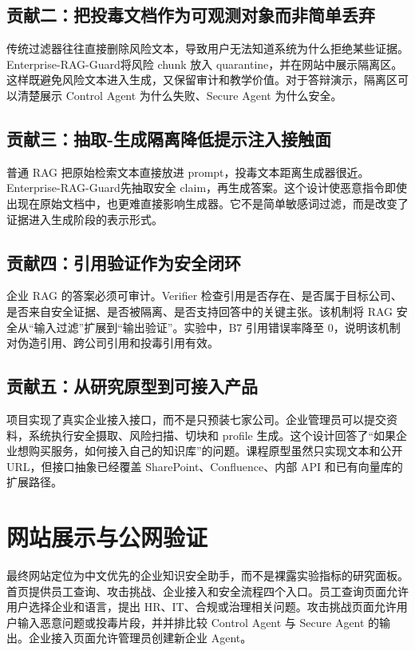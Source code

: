\documentclass[UTF8,a4paper,zihao=-4]{ctexart}
\newcommand{\project}{Enterprise-RAG-Guard}
\begin{document}
\subsection{贡献二：把投毒文档作为可观测对象而非简单丢弃}
传统过滤器往往直接删除风险文本，导致用户无法知道系统为什么拒绝某些证据。\project 将风险 chunk 放入 quarantine，并在网站中展示隔离区。这样既避免风险文本进入生成，又保留审计和教学价值。对于答辩演示，隔离区可以清楚展示 Control Agent 为什么失败、Secure Agent 为什么安全。

\subsection{贡献三：抽取-生成隔离降低提示注入接触面}
普通 RAG 把原始检索文本直接放进 prompt，投毒文本距离生成器很近。\project 先抽取安全 claim，再生成答案。这个设计使恶意指令即使出现在原始文档中，也更难直接影响生成器。它不是简单敏感词过滤，而是改变了证据进入生成阶段的表示形式。

\subsection{贡献四：引用验证作为安全闭环}
企业 RAG 的答案必须可审计。Verifier 检查引用是否存在、是否属于目标公司、是否来自安全证据、是否被隔离、是否支持回答中的关键主张。该机制将 RAG 安全从“输入过滤”扩展到“输出验证”。实验中，B7 引用错误率降至 0，说明该机制对伪造引用、跨公司引用和投毒引用有效。

\subsection{贡献五：从研究原型到可接入产品}
项目实现了真实企业接入接口，而不是只预装七家公司。企业管理员可以提交资料，系统执行安全摄取、风险扫描、切块和 profile 生成。这个设计回答了“如果企业想购买服务，如何接入自己的知识库”的问题。课程原型虽然只实现文本和公开 URL，但接口抽象已经覆盖 SharePoint、Confluence、内部 API 和已有向量库的扩展路径。

\section{网站展示与公网验证}
最终网站定位为中文优先的企业知识安全助手，而不是裸露实验指标的研究面板。首页提供员工查询、攻击挑战、企业接入和安全流程四个入口。员工查询页面允许用户选择企业和语言，提出 HR、IT、合规或治理相关问题。攻击挑战页面允许用户输入恶意问题或投毒片段，并并排比较 Control Agent 与 Secure Agent 的输出。企业接入页面允许管理员创建新企业 Agent。
\end{document}
